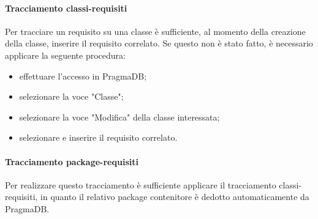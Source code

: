  \paragraph{Tracciamento classi-requisiti}
 Per tracciare un requisito su una classe è sufficiente, al momento della creazione della classe, inserire il requisito correlato. Se questo non è stato fatto, è necessario applicare la seguente procedura:
 \begin{itemize}
 	\item effettuare l'accesso in PragmaDB;
 	\item selezionare la voce "Classe";
 	\item selezionare la voce "Modifica" della classe interessata;
 	\item selezionare e inserire il requisito correlato.
 \end{itemize}
 \paragraph{Tracciamento package-requisiti}
 Per realizzare questo tracciamento è sufficiente applicare il tracciamento classi-requisiti, in quanto il relativo package contenitore è dedotto automaticamente da PragmaDB.
